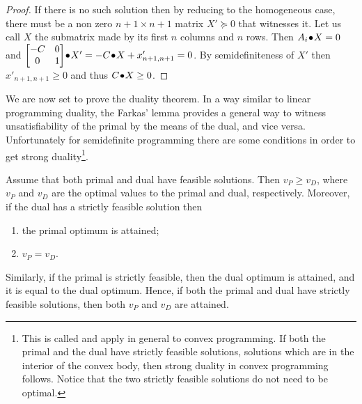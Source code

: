 \documentclass[a4paper,twoside,justified]{tufte-handout}
\begin{document}
\begin{proof}
  If there is no such solution then by reducing to the homogeneous
  case, there must be a non zero $ n+1 \times n+1 $ matrix $ X'\succeq
  0 $ that witnesses it. Let us call $X$ the submatrix made by its
  first $n$ columns and $n$ rows. Then $ {A_{i}}\!\bullet\!{X} =0$
  and $ {\begin{bmatrix} -C & 0\\ 0 &
      1\end{bmatrix}}\!\bullet\!{X'} = -{C}\!\bullet\!{X}+x'_{n+1,n+1} = 0
  $. By semidefiniteness of $ X'$ then $ x'_{n+1,n+1}\geq 0$ and thus
  $ {C}\!\bullet\!{X}\geq 0 $.
\end{proof}

We are now set to prove the duality theorem. In a way similar to
linear programming duality, the Farkas' lemma provides a general way
to witness unsatisfiability of the primal by the means of the dual,
and vice versa. Unfortunately for semidefinite programming there are
some conditions in order to get strong duality\footnote{This is called
   and apply in general to convex
  programming. If both the primal and the dual have strictly feasible
  solutions, \ie solutions which are in the interior of the convex
  body, then strong duality in convex programming follows. Notice that
  the two strictly feasible solutions do not need to be optimal.}.


\begin{theorem}\label{thm:strongduality}
  Assume that both primal and dual have feasible solutions. Then $v_{P}
  \geq v_{D}$, where $v_{P}$ and $ v_{D} $ are the optimal values to
  the primal and dual, respectively. Moreover, if the dual has a
  strictly feasible solution then
  \begin{enumerate}
    \item the primal optimum is attained;
    \item $ v_{P} = v_{D}$.
  \end{enumerate}
  Similarly, if the primal is strictly feasible, then the dual optimum
  is attained, and it is equal to the dual optimum. Hence, if both the
  primal and dual have strictly feasible solutions, then both $v_{P}$
  and $v_{D}$ are attained.
\end{theorem}
\end{document}
